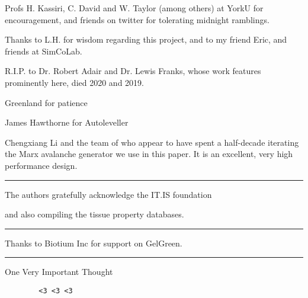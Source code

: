 \documentclass[paper.tex]{subfiles}
\begin{document}
Profs H. Kassiri, C. David and W. Taylor (among others) at YorkU for encouragement, and friends on twitter for tolerating midnight ramblings.

Thanks to L.H. for wisdom regarding this project, and to my friend Eric, and friends at SimCoLab.
%

R.I.P. to Dr. Robert Adair and Dr. Lewis Franks, whose work features prominently here, died 2020 and 2019.

Greenland for patience

James Hawthorne for Autoleveller


Chengxiang Li and the team of who appear to have spent a half-decade iterating the Marx avalanche generator we use in this paper. It is an excellent, very high performance design.



\rule{\linewidth}{0.2pt}

The authors gratefully acknowledge the IT.IS foundation 

and also compiling the tissue property databases.


\rule{\linewidth}{0.2pt}

Thanks to Biotium Inc for support on GelGreen.

\rule{\linewidth}{0.2pt}

One Very Important Thought


{\Large 
	{
\begin{verbatim}
		<3 <3 <3
\end{verbatim}
}} 
\end{document}
